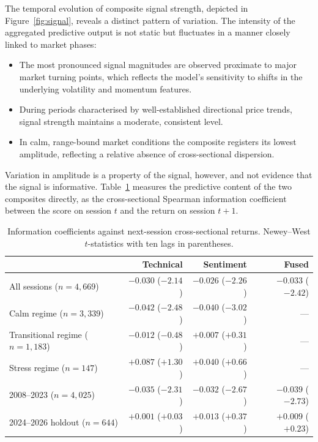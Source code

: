 The temporal evolution of composite signal strength, depicted in
Figure~\ref{fig:signal}, reveals a distinct pattern of variation. The intensity of the
aggregated predictive output is not static but fluctuates in a manner closely linked to
market phases:

\begin{itemize}
\item The most pronounced signal magnitudes are observed proximate to major market
turning points, which reflects the model's sensitivity to shifts in the underlying
volatility and momentum features.
\item During periods characterised by well-established directional price trends, signal
strength maintains a moderate, consistent level.
\item In calm, range-bound market conditions the composite registers its lowest
amplitude, reflecting a relative absence of cross-sectional dispersion.
\end{itemize}

Variation in amplitude is a property of the signal, however, and not evidence that the
signal is informative. Table~\ref{tab:ic} measures the predictive content of the two
composites directly, as the cross-sectional Spearman information coefficient between the
score on session $t$ and the return on session $t+1$.

\begin{table}[!ht]
\centering
\caption{Information coefficients against next-session cross-sectional returns.
Newey--West $t$-statistics with ten lags in parentheses.}
\label{tab:ic}
\footnotesize
\begin{tabular}{p{3.8cm}rrr}
\hline
& \textbf{Technical} & \textbf{Sentiment} & \textbf{Fused} \\
\hline
All sessions ($n=4{,}669$) & $-0.030$ ($-2.14$) & $-0.026$ ($-2.26$) & $-0.033$ ($-2.42$) \\
Calm regime ($n=3{,}339$) & $-0.042$ ($-2.48$) & $-0.040$ ($-3.02$) & --- \\
Transitional regime ($n=1{,}183$) & $-0.012$ ($-0.48$) & $+0.007$ ($+0.31$) & --- \\
Stress regime ($n=147$) & $+0.087$ ($+1.30$) & $+0.040$ ($+0.66$) & --- \\
\hline
2008--2023 ($n=4{,}025$) & $-0.035$ ($-2.31$) & $-0.032$ ($-2.67$) & $-0.039$ ($-2.73$) \\
2024--2026 holdout ($n=644$) & $+0.001$ ($+0.03$) & $+0.013$ ($+0.37$) & $+0.009$ ($+0.23$) \\
\hline
\end{tabular}
\end{table}


